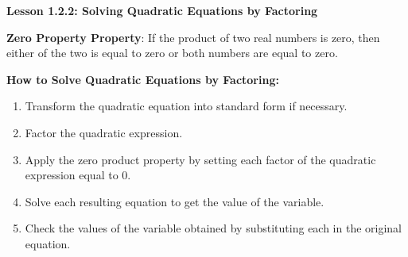 \begin{center}
\textbf{Lesson 1.2.2: Solving Quadratic Equations by Factoring}
\end{center}


\textbf{Zero Property Property}: If the product of two real numbers is zero, then either of the two is equal to zero or both numbers are equal to zero.

\textbf{How to Solve Quadratic Equations by Factoring:}
\begin{enumerate}[label = \color{blue}\arabic*. ]
   \item Transform the quadratic equation into standard form if necessary.
   \item Factor the quadratic expression.
   \item Apply the zero product property by setting each factor of the quadratic expression equal to 0.
   \item Solve each resulting equation to get the value of the variable.
   \item Check the values of the variable obtained by substituting each in the original equation.
\end{enumerate}
  
